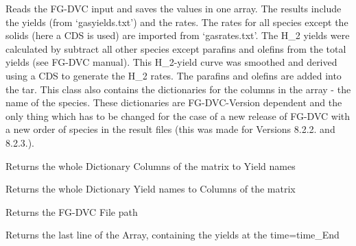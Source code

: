 \documentclass[letterpaper,10pt,english]{sphinxmanual}
\begin{document}
\begin{fulllineitems}
\label{FGDVCClasses:FGDVC_Result.FGDVC_Result}
Reads the FG-DVC input and saves the values in one array. The results include the yields (from `gasyields.txt') and the rates. The rates for all species except the solids (here a CDS is used) are imported from `gasrates.txt'. The H\_2 yields were calculated by subtract all other species except parafins and olefins from the total yields (see FG-DVC manual). This H\_2-yield curve was smoothed and derived using a CDS to generate the H\_2 rates. The parafins and olefins are added into the tar. This class also contains the dictionaries for the columns in the array - the name of the species. These dictionaries are FG-DVC-Version dependent and the only thing which has to be changed for the case of a new release of FG-DVC with a new order of species in the result files (this was made for Versions 8.2.2. and 8.2.3.).

\begin{fulllineitems}
\label{FGDVCClasses:FGDVC_Result.FGDVC_Result.DictCols2Yields}
Returns the whole Dictionary Columns of the matrix to Yield names

\end{fulllineitems}


\begin{fulllineitems}
\label{FGDVCClasses:FGDVC_Result.FGDVC_Result.DictYields2Cols}
Returns the whole Dictionary Yield names to Columns of the matrix

\end{fulllineitems}


\begin{fulllineitems}
\label{FGDVCClasses:FGDVC_Result.FGDVC_Result.FilePath}
Returns the FG-DVC File path

\end{fulllineitems}


\begin{fulllineitems}
\label{FGDVCClasses:FGDVC_Result.FGDVC_Result.FinalYields}
Returns the last line of the Array, containing the yields at the time=time\_End


\end{fulllineitems}
\end{fulllineitems}
\end{document}
